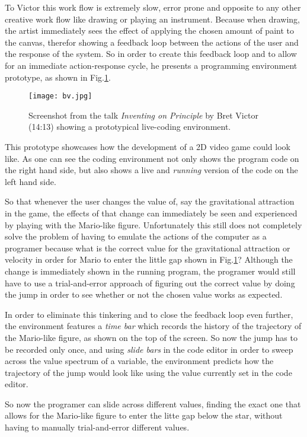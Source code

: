To Victor this work flow is extremely slow, error prone and opposite
to any other creative work flow like drawing or playing an instrument.
Because when drawing, the artist immediately sees the effect of applying
the chosen amount of paint to the canvas, therefor showing a feedback
loop between the actions of the user and the response of the system.
So in order to create this feedback loop and to allow for an immediate
action-response cycle, he presents a programming environment
prototype, as shown in Fig.\ref{bv}.

\begin{figure}[h]
  \texttt{[image: bv.jpg]}
  \caption{Screenshot from the talk \textit{Inventing on Principle} by
          Bret Victor (14:13) showing a prototypical live-coding
          environment.}
  \label{bv}
\end{figure}

This prototype showcases how the development of a 2D video game could
look like. As one can see the coding environment not only shows
the program code on the right hand side, but also shows a live and
\textit{running} version of the code on the left hand side.

So that whenever the user changes the value of, say the gravitational
attraction in the game, the effects of that change can immediately be
seen and experienced by playing with the Mario-like figure.
Unfortunately this still does not completely solve the problem of
having to emulate the actions of the computer as a programer because
what is the correct value for the gravitational attraction or velocity
in order for Mario to enter the little gap shown in Fig.\ref{bv}?
Although the change is immediately shown in the running program,
the programer would still have to use a trial-and-error approach
of figuring out the correct value by doing the jump in order to
see whether or not the chosen value works as expected.

In order to eliminate this tinkering and to close the feedback
loop even further, the environment features a \textit{time bar}
which records the history of the trajectory of the Mario-like
figure, as shown on the top of the screen.
So now the jump has to be recorded only once, and using
\textit{slide bars} in the code editor in order to sweep across
the value spectrum of a variable, the environment predicts how
the trajectory of the jump would look like using the value
currently set in the code editor.

So now the programer can slide across different values, finding
the exact one that allows for the Mario-like figure to enter the litte gap
below the star, without having to manually trial-and-error different
values.
\newline

